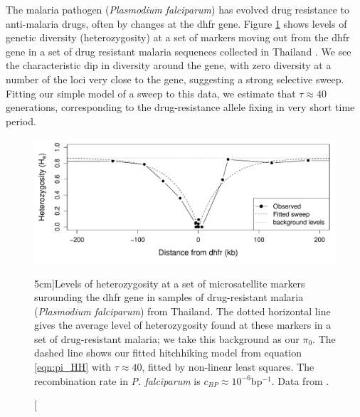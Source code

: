 The malaria pathogen ({\it Plasmodium falciparum}) has
evolved drug resistance to anti-malaria drugs, often by changes at
the dhfr gene. Figure \ref{fig:hitchhiking_malaria} shows levels of
genetic diversity (heterozygosity) at a set of markers moving out from the dhfr gene in a
set of  drug resistant malaria sequences collected in
Thailand \citep{nash2005selection}. We see the characteristic dip in diversity around the gene,
with zero diversity at a number of the loci very close to the gene,
suggesting a strong selective sweep. Fitting our simple model of a
sweep to this data,  we estimate that $\tau \approx 40$ generations,
corresponding to the drug-resistance allele fixing in very short time period. 

\begin{figure}
\begin{center}
\includegraphics[width=\textwidth]{Journal_figs/recom_selection/malaria_sweep/dhfr_sweep.pdf}
\end{center}
\caption[][5cm]{Levels of heterozygosity at a set of microsatellite markers
  surounding the dhfr gene in samples of drug-resistant malaria ({\it Plasmodium falciparum}) from
  Thailand. The dotted horizontal line gives the average level of
  heterozygosity found at these markers in a set of drug-resistant
  malaria; we take this background as our $\pi_0$. The dashed line shows
  our fitted hitchhiking model from equation \ref{eqn:pi_HH} with $\tau \approx 40$, fitted by
  non-linear least squares. The recombination rate in {\it P.
    falciparum} is $c_{BP}\approx 10^{-6}$bp$^{-1}$. Data from
  \citet{nash2005selection}. } \label{fig:hitchhiking_malaria}
\end{figure}



